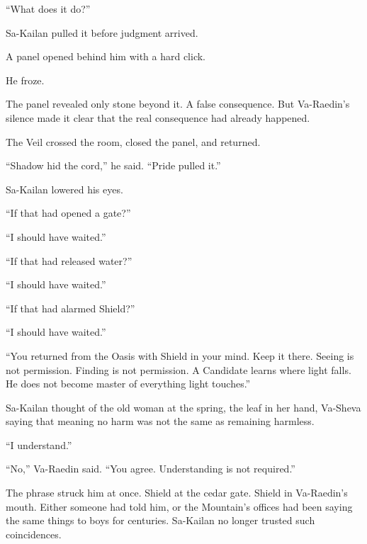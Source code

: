“What does it do?”\par

Sa-Kailan pulled it before judgment arrived.\par

A panel opened behind him with a hard click.\par

He froze.\par

The panel revealed only stone beyond it.
A false consequence.
But Va-Raedin’s silence made it clear that the real consequence had already happened.\par

The Veil crossed the room, closed the panel, and returned.\par

“Shadow hid the cord,” he said.
“Pride pulled it.”\par

Sa-Kailan lowered his eyes.\par

“If that had opened a gate?”\par

“I should have waited.”\par

“If that had released water?”\par

“I should have waited.”\par

“If that had alarmed Shield?”\par

“I should have waited.”\par

“You returned from the Oasis with Shield in your mind.
Keep it there.
Seeing is not permission.
Finding is not permission.
A Candidate learns where light falls.
He does not become master of everything light touches.”\par

Sa-Kailan thought of the old woman at the spring, the leaf in her hand, Va-Sheva saying that meaning no harm was not the same as remaining harmless.\par

“I understand.”\par

“No,” Va-Raedin said.
“You agree.
Understanding is not required.”\par

The phrase struck him at once.
Shield at the cedar gate.
Shield in Va-Raedin’s mouth.
Either someone had told him, or the Mountain’s offices had been saying the same things to boys for centuries.
Sa-Kailan no longer trusted such coincidences.\par

